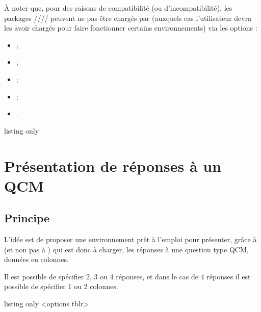 \documentclass[french,11pt,a4paper]{article}
\begin{document}
À noter que, pour des raisons de compatibilité (ou d'incompatibilité), les packages //// peuvent ne pas être chargés par  (auxquels cas l'utilisateur devra les avoir chargés pour faire fonctionner certains environnements) via les options :

\begin{itemize}
	\item {} ;
	\item {} ;
	\item {} ;
	\item {} ;
	\item {}.
\end{itemize}

\begin{DemoCode}{listing only}
\usepackage{customenvs}

\usepackage[option(s)]{customenvs}
\end{DemoCode}

\newpage

\section{Présentation de réponses à un QCM}

\subsection{Principe}

L'idée est de proposer une environnement prêt à l'emploi pour présenter, grâce à  (et non pas à ) qui est donc à charger, les réponses à une question type QCM, données en colonnes.

\smallskip

Il est possible de spécifier 2, 3 ou 4 réponses, et dans le cas de 4 réponses il est possible de spécifier 1 ou 2 colonnes.

\begin{DemoCode}{listing only}
<options tblr>
\end{DemoCode}
\end{document}
